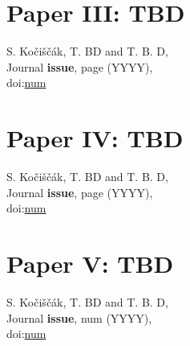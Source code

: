 \documentclass[11pt,twoside,openright]{book}
\begin{document}
\chapter{Paper III: TBD}
S. Ko{\v{c}}i{\v{s}}{\v{c}}{\'a}k, T. BD and T. B. D,\\
Journal {\bf issue}, page (YYYY),\\
doi:\href{https://doi.org/num}{num}
\newpage\null\newpage
% 


\chapter{Paper IV: TBD}
S. Ko{\v{c}}i{\v{s}}{\v{c}}{\'a}k, T. BD and T. B. D,\\
Journal {\bf issue}, page (YYYY),\\
doi:\href{https://doi.org/num}{num}
\newpage\null\newpage
% 


\chapter{Paper V: TBD}
S. Ko{\v{c}}i{\v{s}}{\v{c}}{\'a}k, T. BD and T. B. D,\\
Journal {\bf issue}, num (YYYY),\\
doi:\href{https://doi.org/num}{num}
\newpage\null\newpage
% 
\end{document}
